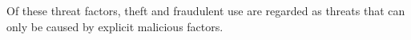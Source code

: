 

Of these threat factors, theft and fraudulent use are regarded as
threats that can only be caused by explicit malicious factors.



